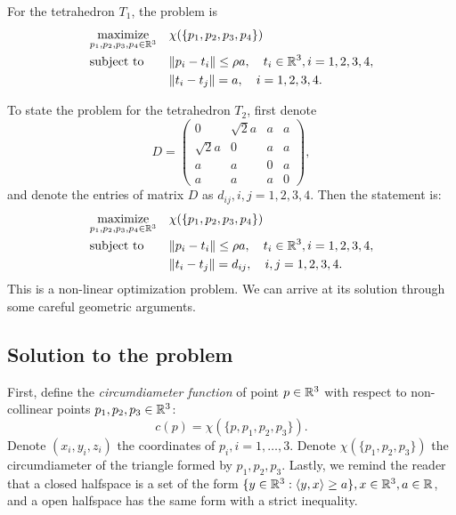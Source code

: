 \noindent For the tetrahedron $T_1$, the problem is 
\begin{equation}\label{prob:tetra1}
\begin{aligned}
& \underset{p_1,p_2,p_3,p_4\in {\mathbb R^3}}{\text{maximize}}
& & \chi(\{p_1,p_2,p_3,p_4\}) \\
& \text{subject to}
& & \| p_i - t_i\| \leq \rho a, \quad t_i\in {\mathbb R^3}, i=1,2,3,4, \\
& & &\|t_i - t_j\| = a, \quad i=1,2,3,4. 
\end{aligned}
\end{equation}

\noindent To state the problem for the tetrahedron $T_2$, first denote 
$$D = \begin{pmatrix}
0 & \sqrt 2  a & a & a \\
\sqrt 2 a & 0 & a & a \\
a & a & 0 & a\\
a & a & a & 0
\end{pmatrix},
$$
and denote the entries of matrix $D$ as $d_{ij}, i,j=1,2,3,4$. Then the statement is:
\begin{equation}\label{prob:tetra2}
\begin{aligned}
& \underset{p_1,p_2,p_3,p_4\in {\mathbb R^3}}{\text{maximize}}
& & \chi(\{p_1,p_2,p_3,p_4\}) \\
& \text{subject to}
& & \|p_i - t_i\| \leq \rho a, \quad t_i\in {\mathbb R^3}, i=1,2,3,4, \\
& & & \|t_i-t_j\| = d_{ij}, \quad i,j=1,2,3,4.\\
\end{aligned}
\end{equation}
This is a non-linear optimization problem. We can arrive at its solution through some careful geometric arguments.

\subsection{Solution to the problem}
First, define the \textit{circumdiameter function} of point $p \in {\mathbb R^3}$ with respect to non-collinear points $p_1,p_2,p_3 \in {\mathbb R^3}$:
$$c(p) = \chi(\{p,p_1,p_2,p_3\}).$$
Denote $(x_i,y_i,z_i)$ the coordinates of $p_i, i=1,\dots,3$. Denote $\chi(\{p_1,p_2,p_3\})$ the circumdiameter of the triangle formed by $p_1,p_2,p_3$. Lastly, we remind the reader that a closed halfspace is a set of the form $\{y\in {\mathbb R^3}: \langle y, x \rangle \geq a\}, x\in{\mathbb R^3}, a\in \mathbb{R} $, and a open halfspace has the same form with a strict inequality.

